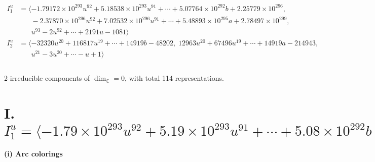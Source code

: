 \documentclass[1p]{elsarticle_modified}
\theoremstyle{definition}
\begin{document}
\begin{align*}
I^u_{1}&=\langle 
-1.79172\times10^{293} u^{92}+5.18538\times10^{293} u^{91}+\cdots+5.07764\times10^{292} b+2.25779\times10^{296},\\
\phantom{I^u_{1}}&\phantom{= \langle  }-2.37870\times10^{296} u^{92}+7.02532\times10^{296} u^{91}+\cdots+5.48893\times10^{295} a+2.78497\times10^{299},\\
\phantom{I^u_{1}}&\phantom{= \langle  }u^{93}-2 u^{92}+\cdots+2191 u-1081\rangle \\
I^u_{2}&=\langle 
-32320 u^{20}+116817 u^{19}+\cdots+14919 b-48202,\;12963 u^{20}+67496 u^{19}+\cdots+14919 a-214943,\\
\phantom{I^u_{2}}&\phantom{= \langle  }u^{21}-3 u^{20}+\cdots- u+1\rangle \\
\\
\end{align*}
\raggedright * 2 irreducible components of $\dim_{\mathbb{C}}=0$, with total 114 representations.\\
\newpage
\renewcommand{\arraystretch}{1}
\centering \section*{I. $I^u_{1}= \langle -1.79\times10^{293} u^{92}+5.19\times10^{293} u^{91}+\cdots+5.08\times10^{292} b+2.26\times10^{296},\;-2.38\times10^{296} u^{92}+7.03\times10^{296} u^{91}+\cdots+5.49\times10^{295} a+2.78\times10^{299},\;u^{93}-2 u^{92}+\cdots+2191 u-1081 \rangle$}
\flushleft \textbf{(i) Arc colorings}\\
\end{document}
